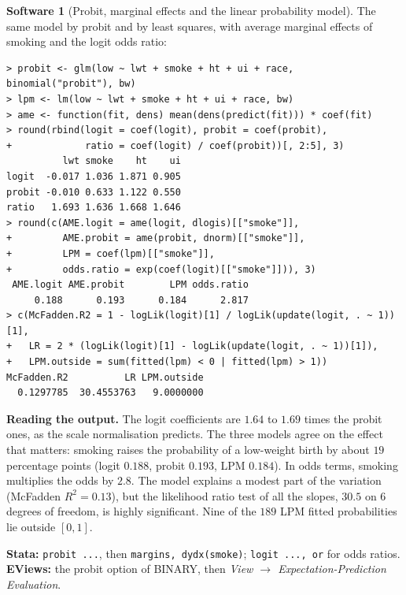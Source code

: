 \documentclass[11pt,a4paper]{article}
\numberwithin{equation}{section}
\theoremstyle{definition}
\newtheorem{software}[thm]{Software}
\begin{document}
\begin{software}[Probit, marginal effects and the linear probability model]
\label{sw:probit}
The same model by probit and by least squares, with average marginal effects of smoking and the logit odds ratio:
{\small\begin{verbatim}
> probit <- glm(low ~ lwt + smoke + ht + ui + race, binomial("probit"), bw)
> lpm <- lm(low ~ lwt + smoke + ht + ui + race, bw)
> ame <- function(fit, dens) mean(dens(predict(fit))) * coef(fit)
> round(rbind(logit = coef(logit), probit = coef(probit),
+             ratio = coef(logit) / coef(probit))[, 2:5], 3)
          lwt smoke    ht    ui
logit  -0.017 1.036 1.871 0.905
probit -0.010 0.633 1.122 0.550
ratio   1.693 1.636 1.668 1.646
> round(c(AME.logit = ame(logit, dlogis)[["smoke"]],
+         AME.probit = ame(probit, dnorm)[["smoke"]],
+         LPM = coef(lpm)[["smoke"]],
+         odds.ratio = exp(coef(logit)[["smoke"]])), 3)
 AME.logit AME.probit        LPM odds.ratio 
     0.188      0.193      0.184      2.817 
> c(McFadden.R2 = 1 - logLik(logit)[1] / logLik(update(logit, . ~ 1))[1],
+   LR = 2 * (logLik(logit)[1] - logLik(update(logit, . ~ 1))[1]),
+   LPM.outside = sum(fitted(lpm) < 0 | fitted(lpm) > 1))
McFadden.R2          LR LPM.outside 
  0.1297785  30.4553763   9.0000000 
\end{verbatim}}
\textbf{Reading the output.} The logit coefficients are $1.64$ to $1.69$ times the probit ones, as the scale normalisation predicts. The three models agree on the
effect that matters: smoking raises the probability of a low-weight birth by about $19$ percentage points (logit $0.188$, probit $0.193$, LPM $0.184$). In odds
terms, smoking multiplies the odds by $2.8$. The model explains a modest part of the variation (McFadden $R^2 = 0.13$), but the likelihood ratio test of all the
slopes, $30.5$ on $6$ degrees of freedom, is highly significant. Nine of the $189$ LPM fitted probabilities lie outside $[0, 1]$.

\textbf{Stata:} \texttt{probit ...}, then \texttt{margins, dydx(smoke)}; \texttt{logit ..., or} for odds ratios. \textbf{EViews:} the probit option of BINARY,
then \emph{View $\to$ Expectation-Prediction Evaluation}.
\end{software}
\end{document}
